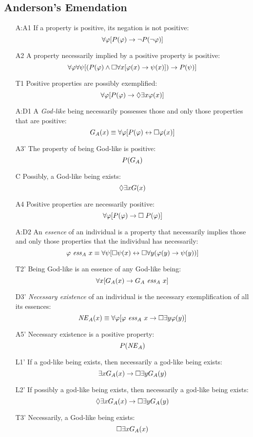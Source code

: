 \documentclass{birkjour}
\theoremstyle{definition}
\theoremstyle{remark}
\numberwithin{equation}{section}
\begin{document}
\begin{appendix}
\section{Anderson's Emendation} \label{apx:Anderson}

\begin{itemize}
\item[A:A1] If a property is positive, its negation is not positive:
  $$\forall \varphi [P(\varphi) \rightarrow \neg P(\neg \varphi)]$$ 
\item[A2] A property necessarily implied by a
  positive property is positive:
  $$\forall \varphi \forall \psi [(P(\varphi) \wedge \Box \forall x [\varphi(x)
  \rightarrow \psi(x)]) \rightarrow P(\psi)]$$
\item[T1] Positive properties are possibly exemplified: 
  $$\forall \varphi [P(\varphi) \rightarrow \Diamond \exists x \varphi(x)]$$ 
\item[A:D1] A \emph{God-like} being necessarily possesses those and only those properties that are positive: 
  $$G_A(x) \equiv \forall \varphi [P(\varphi) \leftrightarrow \Box \varphi(x)]$$ 
\item[A3']  The property of being God-like is positive: 
  $$P(G_A)$$
\item[C\phantom{1}] Possibly, a God-like being exists: $$\Diamond \exists x G(x)$$
\item[A4]  Positive properties are necessarily positive: 
  $$\forall \varphi [P(\varphi) \rightarrow \Box \; P(\varphi)]$$ 
\item[A:D2] An \emph{essence} of an individual is a property that necessarily implies those and only those properties that the individual has necessarily: $$\varphi \ \mathit{ess}_A \ x \equiv \forall
  \psi [\Box \psi(x) \leftrightarrow \Box \forall y (\varphi(y) \rightarrow \psi(y))]$$ 
\item[T2']  Being God-like is an essence of any
  God-like being: $$\forall x [G_A(x) \rightarrow G_A \ \mathit{ess}_A \ x]$$
\item[D3'] \emph{Necessary existence} of an individual is the necessary exemplification of all its essences: 
  $$\mathit{NE}_A(x) \equiv \forall \varphi [\varphi \ \mathit{ess}_A \ x \rightarrow \Box
  \exists y \varphi(y)]$$
\item[A5'] Necessary existence is a positive property: $$P(\mathit{NE}_A)$$ 
\item[L1'] If a god-like being exists, then necessarily a god-like being exists: 
  $$\exists x G_A(x) \rightarrow \Box \exists y G_A(y)$$
\item[L2'] If possibly a god-like being exists, then necessarily a god-like being exists: 
  $$\Diamond \exists x G_A(x) \rightarrow \Box \exists y G_A(y) $$
%
\item[T3'] Necessarily, a God-like being exists: $$\Box \exists x G_A(x)$$ 
\end{itemize}



\end{appendix}
\end{document}
